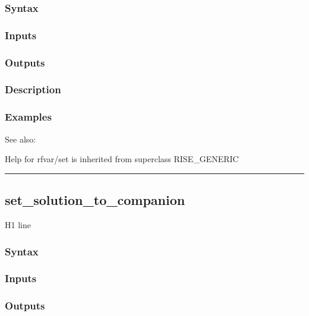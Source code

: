 \documentclass[letterpaper,10pt,english]{sphinxmanual}
\begin{document}
\subsubsection{Syntax}
\label{classes/models/@rfvar/rfvar:id110}

\subsubsection{Inputs}
\label{classes/models/@rfvar/rfvar:id111}

\subsubsection{Outputs}
\label{classes/models/@rfvar/rfvar:id112}

\subsubsection{Description}
\label{classes/models/@rfvar/rfvar:id113}

\subsubsection{Examples}
\label{classes/models/@rfvar/rfvar:id114}
See also:

Help for rfvar/set is inherited from superclass RISE\_GENERIC


\bigskip\hrule{}\bigskip



\subsection{set\_solution\_to\_companion}
\label{classes/models/@rfvar/rfvar:set-solution-to-companion}\label{classes/models/@rfvar/rfvar:id115}
H1 line


\subsubsection{Syntax}
\label{classes/models/@rfvar/rfvar:id116}

\subsubsection{Inputs}
\label{classes/models/@rfvar/rfvar:id117}

\subsubsection{Outputs}
\label{classes/models/@rfvar/rfvar:id118}
\end{document}
